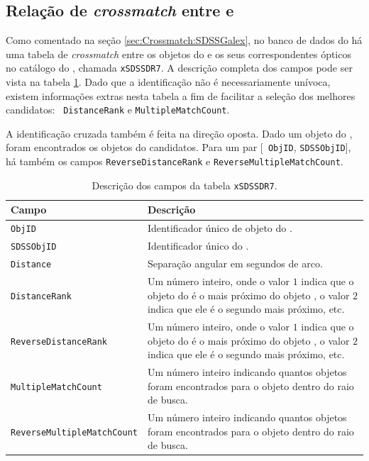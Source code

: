 \subsection{Relação de {\em crossmatch} entre \SDSS e \galex}
\label{sec:Crossmatch:DefAmostras:IdSDSSGalex}

Como comentado na seção \ref{sec:Crossmatch:SDSSGalex}, no banco de dados do
\galex há uma tabela de {\em crossmatch} entre os objetos do \galex e os seus
correspondentes ópticos no catálogo do \SDSS, chamada \texttt{xSDSSDR7}. A
descrição completa dos campos pode ser vista na tabela \ref{tab:CamposXSDSSDR7}.
Dado que a identificação não é necessariamente unívoca, existem informações
extras nesta tabela a fim de facilitar a seleção dos melhores candidatos: {\tt
DistanceRank} e \texttt{MultipleMatchCount}.

A identificação cruzada também é feita na direção oposta. Dado um objeto do
\SDSS, foram encontrados os objetos do \galex candidatos. Para um par [{\tt
ObjID}, \texttt{SDSSObjID}], há também os campos \texttt{ReverseDistanceRank} e
{\tt ReverseMultipleMatchCount}.

\begin{table}
	\caption[Descrição dos campos da tabela \texttt{xSDSSDR7}.]
	{Descrição dos campos da tabela \texttt{xSDSSDR7}.}
	\begin{tabular}{l p{8cm}}
		Campo & Descrição\\
		\midrule
		\texttt{ObjID} &
		Identificador único de objeto do \galex.
		\\
		\texttt{SDSSObjID} &
		Identificador único do \SDSS.
		\\
		\texttt{Distance} &
		Separação angular em segundos de arco.
		\\
		\texttt{DistanceRank} &
		Um número inteiro, onde o valor $1$ indica que o objeto do \galex é o
		mais próximo do objeto \SDSS, o valor $2$ indica que ele é o segundo mais
		próximo, etc.
		\\
		\texttt{ReverseDistanceRank} &
		Um número inteiro, onde o valor $1$ indica que o objeto do \SDSS é o mais
		próximo do objeto \galex, o valor $2$ indica que ele é o segundo mais
		próximo, etc.
		\\
		\texttt{MultipleMatchCount} &
		Um número inteiro indicando quantos objetos \SDSS foram encontrados para o
		objeto \galex dentro do raio de busca.
		\\
		\texttt{ReverseMultipleMatchCount} &
		Um número inteiro indicando quantos objetos \galex foram encontrados para o
		objeto \SDSS dentro do raio de busca.
		\\
	\end{tabular}
	\label{tab:CamposXSDSSDR7}
\end{table}

